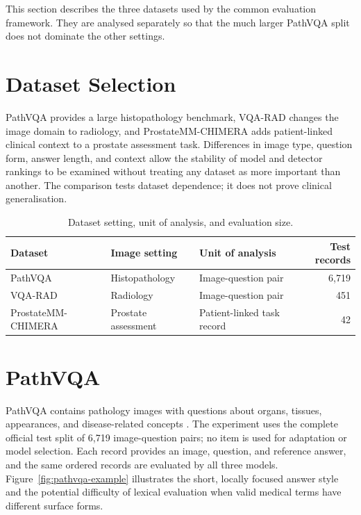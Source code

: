 This section describes the three datasets used by the common evaluation framework. They are analysed separately so that the much larger PathVQA split does not dominate the other settings.

\section{Dataset Selection}

PathVQA provides a large histopathology benchmark, VQA-RAD changes the image domain to radiology, and ProstateMM-CHIMERA adds patient-linked clinical context to a prostate assessment task. Differences in image type, question form, answer length, and context allow the stability of model and detector rankings to be examined without treating any dataset as more important than another. The comparison tests dataset dependence; it does not prove clinical generalisation.

\begin{table}[htbp]
    \centering
    \caption{Dataset setting, unit of analysis, and evaluation size.}
    \label{tab:dataset-overview}
    \small
    \begin{tabularx}{\textwidth}{lXXr}
        \toprule
        Dataset & Image setting & Unit of analysis & Test records \\
        \midrule
        PathVQA & Histopathology & Image-question pair & 6,719 \\
        VQA-RAD & Radiology & Image-question pair & 451 \\
        ProstateMM-CHIMERA & Prostate assessment & Patient-linked task record & 42 \\
        \bottomrule
    \end{tabularx}
\end{table}

\section{PathVQA}

PathVQA contains pathology images with questions about organs, tissues, appearances, and disease-related concepts \citep{he2020pathvqa}. The experiment uses the complete official test split of 6,719 image-question pairs; no item is used for adaptation or model selection. Each record provides an image, question, and reference answer, and the same ordered records are evaluated by all three models. Figure~\ref{fig:pathvqa-example} illustrates the short, locally focused answer style and the potential difficulty of lexical evaluation when valid medical terms have different surface forms.

